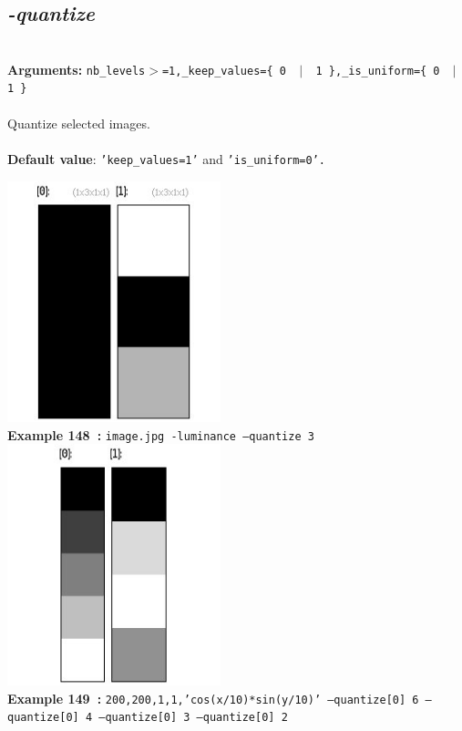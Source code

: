 \documentclass[a4paper,11pt,twoside]{book}
\begin{document}
\subsection{\emph{-quantize} }\vspace*{-0.5em}
~\\\textbf{Arguments: } 
{\small \texttt{nb\_levels$>$=1,\_keep\_values=\{ 0 ~$|$~ 1 \},\_is\_uniform=\{ 0 ~$|$~ 1 \}}}\\~\\
Quantize selected images.
~\\~\\\textbf{Default value}: {\small \texttt{'keep\_values=1'} and \texttt{'is\_uniform=0'.}}
\begin{center}\includegraphics[keepaspectratio=true,height=7cm,width=\textwidth]{img/gmic_def148.jpg}\\
{\footnotesize \textbf{Example 148~:} \texttt{image.jpg -luminance --quantize 3}}
\\\includegraphics[keepaspectratio=true,height=7cm,width=\textwidth]{img/gmic_def149.jpg}\\
{\footnotesize \textbf{Example 149~:} \texttt{200,200,1,1,'cos(x/10)*sin(y/10)' --quantize[0] 6 --quantize[0] 4 --quantize[0] 3 --quantize[0] 2}}
\end{center}
\end{document}
